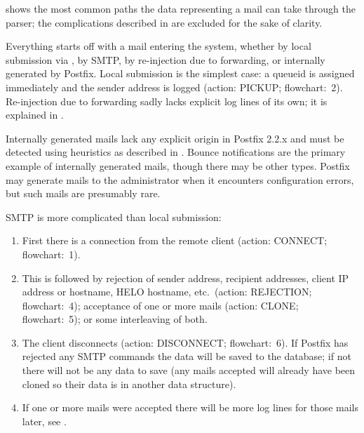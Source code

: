  shows the most common paths the data
representing a mail can take through the parser; the complications
described in  are excluded for the sake of
clarity.


\label{mail-enters-the-system}

Everything starts off with a mail entering the system, whether by local
submission via , by \gls{SMTP}, by re-injection due to
forwarding, or internally generated by Postfix.  Local submission is the
simplest case: a queueid is assigned immediately and the sender address is
logged (action: PICKUP\@; flowchart:~2).  Re-injection due to forwarding
sadly lacks explicit log lines of its own; it is explained in
.

Internally generated mails lack any explicit origin in Postfix 2.2.x and
must be detected using heuristics as described in
.  Bounce notifications are
the primary example of internally generated mails, though there may be
other types.  Postfix may generate mails to the administrator when it
encounters configuration errors, but such mails are presumably rare.

\gls{SMTP} is more complicated than local submission:

\begin{enumerate}

    \item First there is a connection from the remote client (action:
        CONNECT\@; flowchart:~1).

    \item This is followed by rejection of sender address, recipient
        addresses, client \gls{IP} address or hostname, HELO hostname,
        etc.\ (action: REJECTION\@; flowchart:~4); acceptance of one or
        more mails (action: CLONE\@; flowchart:~5); or some interleaving of
        both.

    \item The client disconnects (action: DISCONNECT\@; flowchart:~6).  If
        Postfix has rejected any \gls{SMTP} commands the data will be saved
        to the database; if not there will not be any data to save (any
        mails accepted will already have been cloned so their data is in
        another data structure).

    \item If one or more mails were accepted there will be more log lines
        for those mails later, see .

\end{enumerate}

